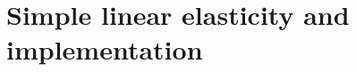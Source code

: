 \documentclass{fancydoc}
\newcommand{\realR}{\rm I\!R}
\begin{document}
\section{Simple linear elasticity and implementation}
%
%
%
%
%
%
%
%
%
%
%
%
%
%
%
%
%
%
%
%
%
\end{document}
